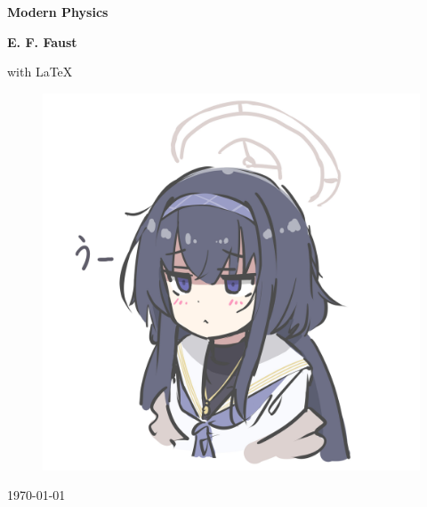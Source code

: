 \documentclass[../main.tex]{subfiles}
\begin{document}
\begin{titlepage}
    \begin{center}
        \vspace*{0.5cm}
        
        \Huge
        \textbf{Modern Physics}
    
        \vspace{1.5cm}
        \Large
        \textbf{E. F. Faust} 

        \vspace{0.2cm}
        \large with \LaTeX
        
        \vfill
        \begin{figure}[h!]
            \centering
            \includegraphics[width=\textwidth]{../Sec/Title/109047897_p1.jpg}
        \end{figure}
        \vfill
        \Large
        {\today}
        
    \end{center}
\end{titlepage}
\end{document}
